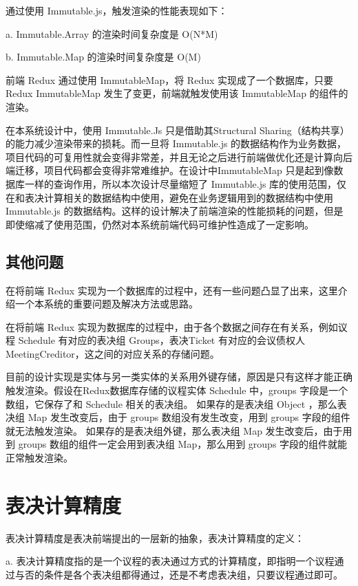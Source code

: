   通过使用 Immutable.js，触发渲染的性能表现如下：

  \quad{}a. Immutable.Array 的渲染时间复杂度是 O(N*M)

  \quad{}b. Immutable.Map 的渲染时间复杂度是 O(M)

  前端 Redux 通过使用 ImmutableMap，将 Redux 实现成了一个数据库，只要 Redux ImmutableMap 发生了变更，前端就触发使用该 ImmutableMap 的组件的渲染。

  在本系统设计中，使用 Immutable.Js 只是借助其Structural Sharing（结构共享）的能力减少渲染带来的损耗。而一旦将 Immutable.js 的数据结构作为业务数据，项目代码的可复用性就会变得非常差，并且无论之后进行前端做优化还是计算向后端迁移，项目代码都会变得非常难维护。在设计中ImmutableMap 只是起到像数据库一样的查询作用，所以本次设计尽量缩短了 Immutable.js 库的使用范围，仅在和表决计算相关的数据结构中使用，避免在业务逻辑用到的数据结构中使用 Immutable.js 的数据结构。这样的设计解决了前端渲染的性能损耗的问题，但是即使缩减了使用范围，仍然对本系统前端代码可维护性造成了一定影响。

  \subsection{其他问题}
  在将前端 Redux 实现为一个数据库的过程中，还有一些问题凸显了出来，这里介绍一个本系统的重要问题及解决方法或思路。

  在将前端 Redux 实现为数据库的过程中，由于各个数据之间存在有关系，例如议程 Schedule 有对应的表决组 Groups，表决Ticket 有对应的会议债权人 MeetingCreditor，这之间的对应关系的存储问题。

  目前的设计实现是实体与另一类实体的关系用外键存储，原因是只有这样才能正确触发渲染。假设在Redux数据库存储的议程实体 Schedule 中，groups 字段是一个数组，它保存了和 Schedule 相关的表决组。
  如果存的是表决组 Object ，那么表决组 Map 发生改变后，由于 groups 数组没有发生改变，用到 groups 字段的组件就无法触发渲染。
  如果存的是表决组外键，那么表决组 Map 发生改变后，由于用到 groups 数组的组件一定会用到表决组 Map，那么用到 groups 字段的组件就能正常触发渲染。

  \section{表决计算精度}
  表决计算精度是表决前端提出的一层新的抽象，表决计算精度的定义：

  \quad{}a. 表决计算精度指的是一个议程的表决通过方式的计算精度，即指明一个议程通过与否的条件是各个表决组都得通过，还是不考虑表决组，只要议程通过即可。


